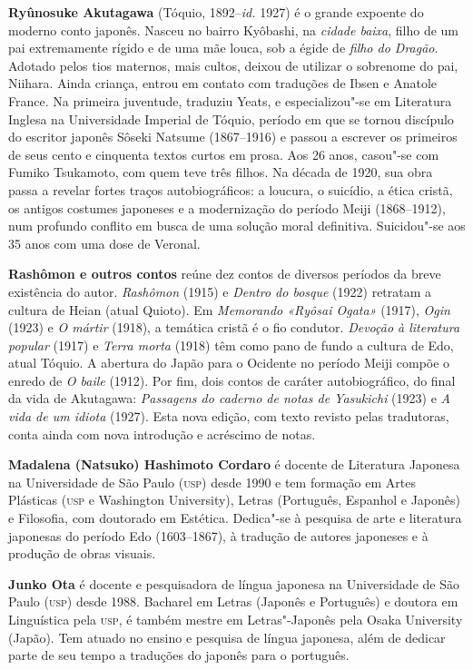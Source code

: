 \textbf{Ryûnosuke Akutagawa} (Tóquio, 1892--\textit{id.} 1927) é o grande expoente 
do moderno conto japonês. Nasceu no bairro Kyôbashi, na \textit{cidade
baixa}, filho de um pai extremamente rígido e de uma mãe louca, sob a égide de 
\textit{filho do Dragão}. Adotado pelos tios maternos, mais cultos,
deixou de utilizar o sobrenome do pai, Niihara. Ainda criança, entrou
em contato com traduções de Ibsen e Anatole France. Na primeira
juventude, traduziu Yeats, e especializou"-se em Literatura Inglesa na
Universidade Imperial de Tóquio, período em que se tornou discípulo do
escritor japonês Sôseki Natsume (1867--1916) e passou a escrever os
primeiros de seus cento e cinquenta textos curtos em prosa. Aos 26
anos, casou"-se com Fumiko Tsukamoto, com quem teve três filhos.
Na década de 1920, sua obra passa a revelar fortes traços
autobiográficos: a loucura, o suicídio, a ética cristã, os antigos 
costumes japoneses e a modernização do período Meiji (1868--1912),
num profundo conflito em busca de uma solução moral definitiva. 
Suicidou"-se aos 35 anos com uma dose de Veronal. 

\textbf{Rashômon e outros contos} reúne dez contos de diversos períodos da
breve existência do autor. \textit{Rashômon} (1915) e \textit{Dentro do bosque} (1922) 
retratam a cultura de Heian (atual Quioto). Em \textit{Memorando «Ryôsai Ogata»} (1917), 
\textit{Ogin} (1923) e \textit{O mártir} (1918), a temática cristã é o fio condutor. 
\textit{Devoção à literatura popular} (1917) e \textit{Terra morta} (1918) têm como pano de fundo 
a cultura de Edo, atual Tóquio. A abertura do Japão para o Ocidente no período 
Meiji compõe o enredo de \textit{O baile} (1912). Por fim, dois contos de caráter autobiográfico, 
do final da vida de Akutagawa: \textit{Passagens do caderno de notas de Yasukichi} (1923) 
e \textit{A vida de um idiota} (1927). Esta nova edição, com texto revisto pelas tradutoras, 
conta ainda com nova introdução e acréscimo de notas.      

\textbf{Madalena (Natsuko) Hashimoto Cordaro} é docente de Literatura Japonesa na Universidade de São Paulo
(\textsc{usp}) desde 1990 e tem formação em Artes Plásticas (\textsc{usp} 
e Washington University), Letras (Português, Espanhol e Japonês) e Filosofia, com doutorado em Estética. Dedica"-se à pesquisa de arte e literatura japonesas do período Edo (1603--1867), 
à tradução de autores japoneses e à produção de obras visuais.

\textbf{Junko Ota} é docente e pesquisadora de língua japonesa na Universidade de São Paulo
(\textsc{usp}) desde 1988. Bacharel em Letras (Japonês e Português) e doutora em Linguística pela \textsc{usp}, é também mestre em Letras"-Japonês pela Osaka University (Japão). Tem atuado no ensino e pesquisa de língua japonesa, além de dedicar parte de seu tempo a traduções do japonês para o português.   




